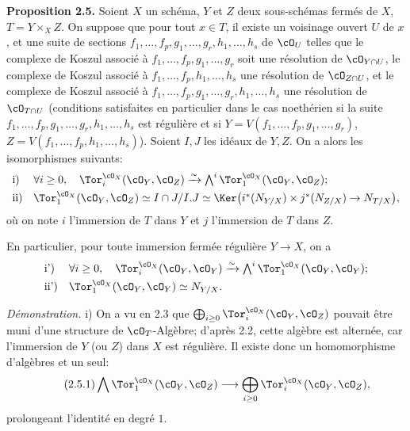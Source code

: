 \textbf{Proposition 2.5.} Soient \(X\) un schéma, \(Y\) et \(Z\) deux sous-schémas fermés de \(X\), \(T=Y\times_X Z\). On suppose que pour tout \(x\in T\), il existe un voisinage ouvert \(U\) de \(x\), et une
suite de sections \(f_1,\ldots,f_p,g_1,\ldots,g_r,h_1,\ldots,h_s\) de \(\cO_U\) telles que le complexe de Koszul associé à \(f_1,\ldots,f_p,g_1,\ldots,g_r\) soit une résolution de \(\cO_{Y\cap U}\), le complexe de Koszul associé à \(f_1,\ldots,f_p,h_1,\ldots,h_s\) une résolution de \(\cO_{Z\cap U}\), et le complexe de Koszul associé à \(f_1,\ldots,f_p,g_1,\ldots,g_r,h_1,\ldots,h_s\) une résolution de \(\cO_{T\cap U}\) (conditions satisfaites en particulier dans le cas noethérien si la suite \(f_1,\ldots,f_p,g_1,\ldots,g_r,h_1,\ldots,h_s\) est régulière et si \(Y=V(f_1,\ldots,f_p,g_1,\ldots,g_r)\), \(Z=V(f_1,\ldots,f_p,h_1,\ldots,h_s)\)). Soient \(I,J\) les idéaux de \(Y,Z\). On a alors les isomorphismes suivants:
\[
\begin{array}{ll}
\text{i)}& \forall i\ge0,\quad
\Tor_i^{\cO_X}(\cO_Y,\cO_Z)\xrightarrow{\sim}
\bigwedge^i\Tor_1^{\cO_X}(\cO_Y,\cO_Z);\\[0.8ex]
\text{ii)}&
\Tor_1^{\cO_X}(\cO_Y,\cO_Z)\simeq
I\cap J/I.J\simeq
\Ker\bigl(i^*(N_{Y/X})\times j^*(N_{Z/X})\to N_{T/X}\bigr),
\end{array}
\]
où on note \(i\) l'immersion de \(T\) dans \(Y\) et \(j\) l'immersion de \(T\) dans \(Z\).

En particulier, pour toute immersion fermée régulière \(Y\to X\), on a
\[
\begin{array}{ll}
\text{i')}& \forall i\ge0,\quad
\Tor_i^{\cO_X}(\cO_Y,\cO_Y)\xrightarrow{\sim}
\bigwedge^i\Tor_1^{\cO_X}(\cO_Y,\cO_Y);\\[0.8ex]
\text{ii')}&
\Tor_1^{\cO_X}(\cO_Y,\cO_Y)\simeq N_{Y/X}.
\end{array}
\]

\emph{Démonstration.} i) On a vu en 2.3 que \(\bigoplus_{i\ge0}\Tor_i^{\cO_X}(\cO_Y,\cO_Z)\) pouvait être muni d'une structure de \(\cO_T\)-Algèbre; d'après 2.2, cette algèbre est alternée, car l'immersion de \(Y\) (ou \(Z\)) dans \(X\) est régulière. Il existe donc un homomorphisme d'algèbres et un seul:
\begin{equation}\tag{2.5.1}
\bigwedge \Tor_1^{\cO_X}(\cO_Y,\cO_Z)\longrightarrow
\bigoplus_{i\ge0}\Tor_i^{\cO_X}(\cO_Y,\cO_Z),
\end{equation}
prolongeant l'identité en degré \(1\).

